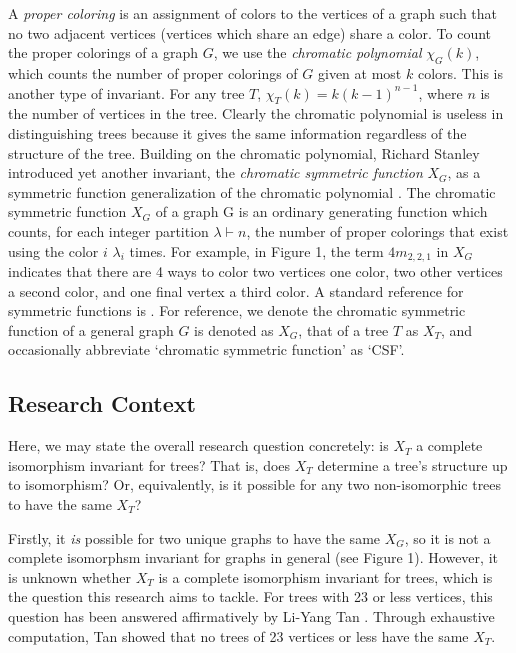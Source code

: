 \documentclass[a4paper,12pt]{article}
\begin{document}
\begin{spacing}{1}
A \emph{proper coloring} is an assignment of colors to the vertices of a graph such that no two adjacent vertices (vertices which share an edge) share a color. To count the proper colorings of a graph $G$, we use the \emph{chromatic polynomial} $\chi_G(k)$, which counts the number of proper colorings of $G$ given at most $k$ colors. This is another type of invariant. For any tree $T$, $\chi_T(k) = k(k - 1)^{n - 1}$, where $n$ is the number of vertices in the tree. Clearly the chromatic polynomial is useless in distinguishing trees because it gives the same information regardless of the structure of the tree. Building on the chromatic polynomial, Richard Stanley introduced yet another invariant, the \emph{chromatic symmetric function} $X_G$, as a symmetric function generalization of the chromatic polynomial \cite{csfstanley}. The chromatic symmetric function $X_G$ of a graph G is an ordinary generating function which counts, for each integer partition $\lambda\vdash n$, the number of proper colorings that exist using the color $i$ $\lambda_i$ times. For example, in Figure 1, the term $4m_{2,2,1}$ in $X_G$ indicates that there are 4 ways to color two vertices one color, two other vertices a second color, and one final vertex a third color. A standard reference for symmetric functions is \cite{enumerative}. For reference, we denote the chromatic symmetric function of a general graph $G$ is denoted as $X_G$, that of a tree $T$ as $X_T$, and occasionally abbreviate `chromatic symmetric function' as `CSF'.

\subsection*{Research Context}
Here, we may state the overall research question concretely: is $X_T$ a complete isomorphism invariant for trees? That is, does $X_T$ determine a tree's structure up to isomorphism? Or, equivalently, is it possible for any two non-isomorphic trees to have the same $X_T$?

Firstly, it \emph{is} possible for two unique graphs to have the same $X_G$, so it is not a complete isomorphsm invariant for graphs in general (see Figure 1). However, it is unknown whether $X_T$ is a complete isomorphism invariant for trees, which is the question this research aims to tackle. For trees with 23 or less vertices, this question has been answered affirmatively by Li-Yang Tan \cite{tantrees}. Through exhaustive computation, Tan showed that no trees of 23 vertices or less have the same $X_T$.


\end{spacing}
\end{document}
